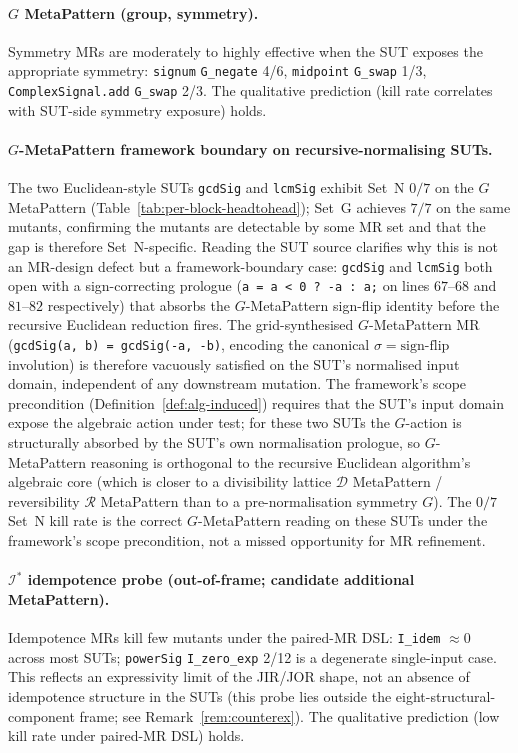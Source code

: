 \documentclass[acmsmall,screen,review]{acmart}
\begin{document}
\paragraph{$G$ MetaPattern (group, symmetry).}
Symmetry MRs are moderately to highly effective when the SUT exposes
the appropriate symmetry: \texttt{signum} \texttt{G\_negate} 4/6,
\texttt{midpoint} \texttt{G\_swap} 1/3, \texttt{ComplexSignal.add}
\texttt{G\_swap} 2/3. The qualitative prediction (kill rate correlates
with SUT-side symmetry exposure) holds.

\paragraph{$G$-MetaPattern framework boundary on recursive-normalising SUTs.}
\label{para:g-block-euclidean-boundary}
The two Euclidean-style SUTs \texttt{gcdSig} and \texttt{lcmSig}
exhibit Set~N $0/7$ on the $G$ MetaPattern (Table~\ref{tab:per-block-headtohead});
Set~G achieves $7/7$ on the same mutants, confirming the mutants are
detectable by some MR set and that the gap is therefore Set~N-specific.
Reading the SUT source clarifies why this is not an MR-design defect
but a framework-boundary case: \texttt{gcdSig} and \texttt{lcmSig}
both open with a sign-correcting prologue (\texttt{a = a < 0 ? -a : a;}
on lines $67$--$68$ and $81$--$82$ respectively) that absorbs the
$G$-MetaPattern sign-flip identity before the recursive Euclidean reduction
fires. The grid-synthesised $G$-MetaPattern MR
(\texttt{gcdSig(a, b) = gcdSig(-a, -b)}, encoding the canonical
$\sigma = \mathrm{sign\text{-}flip}$ involution) is therefore vacuously
satisfied on the SUT's normalised input domain, independent of any
downstream mutation. The framework's scope precondition
(Definition~\ref{def:alg-induced}) requires that the SUT's input
domain expose the algebraic action under test; for these two SUTs the
$G$-action is structurally absorbed by the SUT's own normalisation
prologue, so $G$-MetaPattern reasoning is orthogonal to the recursive
Euclidean algorithm's algebraic core (which is closer to a divisibility
lattice $\mathcal{D}$ MetaPattern / reversibility $\mathcal{R}$ MetaPattern than
to a pre-normalisation symmetry $G$). The $0/7$ Set~N kill rate is the
correct $G$-MetaPattern reading on these SUTs under the framework's
scope precondition, not a missed opportunity for MR refinement.

\paragraph{$\mathcal{I}^{*}$ idempotence probe (out-of-frame; candidate additional MetaPattern).}
Idempotence MRs kill few mutants under the paired-MR DSL:
\texttt{I\_idem} $\approx 0$ across most SUTs; \texttt{powerSig}
\texttt{I\_zero\_exp} 2/12 is a degenerate single-input case. This
reflects an expressivity limit of the JIR/JOR shape, not an absence
of idempotence structure in the SUTs (this probe lies outside the
eight-structural-component frame; see Remark~\ref{rem:counterex}). The qualitative
prediction (low kill rate under paired-MR DSL) holds.
\end{document}
